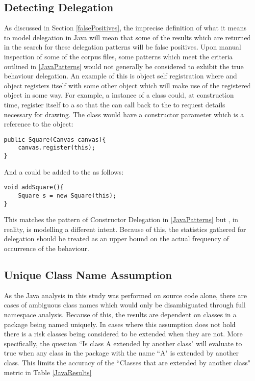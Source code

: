 \subsection{Detecting Delegation}
\label{DetectingDelegation}
As discussed in Section \ref{falsePositives}, the imprecise definition of what it means to model delegation in Java will mean that some of the results which are returned in the search for these delegation patterns will be false positives. Upon manual inspection of some of the corpus files, some patterns which meet the criteria outlined in \ref{JavaPatterns} would not generally be considered to exhibit the true behaviour delegation. An example of this is object self registration where and object registers itself with some other object which will make use of the registered object in some way. For example, a instance of a  class could, at construction time,  register itself to a  so that the  can call back to the  to request details necessary for drawing. The  class would have a constructor parameter which is a reference to the  object:
\begin{lstlisting}
public Square(Canvas canvas){
	canvas.register(this);
}
\end{lstlisting}
And a  could be added to the  as follows:
\begin{lstlisting}
void addSquare(){
	Square s = new Square(this);
}
\end{lstlisting}
This matches the pattern of Constructor Delegation in \ref{JavaPatterns} but , in reality, is modelling a different intent. Because of this, the statistics gathered for delegation should be treated as an upper bound on the actual frequency of occurrence of the behaviour.
\newline

\subsection{Unique Class Name Assumption}
\label{uniqueNames}
As the Java analysis in this study was performed on source code alone, there are cases of ambiguous class names which would only be disambiguated through full namespace analysis. Because of this, the results are dependent on classes in a package being named uniquely. In cases where this assumption does not hold there is a risk classes being considered to be extended when they are not. More specifically, the question ``Is class A extended by another class" will evaluate to true when any class in the package with the name ``A" is extended by another class. This limits the accuracy of the ``Classes that are extended by another class" metric in Table \ref{JavaResults}

